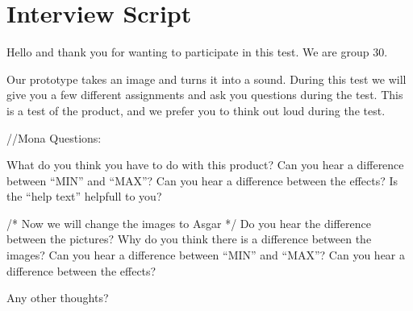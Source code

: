 \chapter{Interview Script}\label{app:interviewscrip}
Hello and thank you for wanting to participate in this test. We are group 30.

Our prototype takes an image and turns it into a sound. During this test we will give you a few different assignments and ask you questions during the test. This is a test of the product, and we prefer you to think out loud during the test.

//Mona
Questions: 

What do you think you have to do with this product?
Can you hear a difference between “MIN” and “MAX”?
Can you hear a difference between the effects?
Is the “help text” helpfull to you?

/* Now we will change the images to Asgar */
Do you hear the difference between the pictures?
Why do you think there is a difference between the images?
Can you hear a difference between “MIN” and “MAX”?
Can you hear a difference between the effects?

Any other thoughts?

